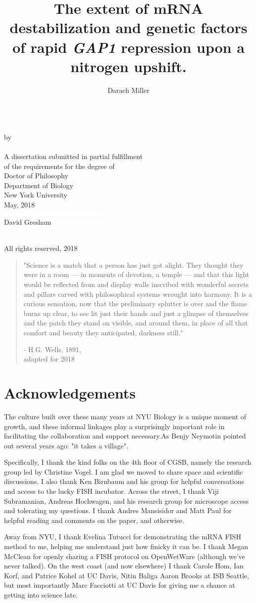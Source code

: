 \documentclass[12pt,letterpaper]{memoir}
\title{
The extent of mRNA destabilization and 
genetic factors of rapid \textit{GAP1} repression 
upon a nitrogen upshift.
}
\author{Darach Miller}
\makeatletter
\def\makemytitle{
  \newpage
\begin{center}
\vfill
  \@title\\
\vfill
  by\\
\vfill
  \@author\\
\vfill
  A dissertation submitted in partial fulfillment \\
  of the requirements for the degree of \\
  Doctor of Philosophy \\
  Department of Biology \\
  New York University \\
\vfill
  \monthz, \yearz\\
  \end{center}
\vfill
\begin{flushright}
  $\rule{5cm}{0.01mm}$\\
  David Gresham
\end{flushright}
  \pagebreak
\begin{center}
  \textcopyright \hspace{0.2em} \@author \\
  All rights reserved, \yearz \\
\end{center}
  \pagebreak
}
\def\monthz{May}
\def\yearz{2018}
\makeatother
\begin{document}
\DoubleSpacing
\frontmatter
\pagestyle{empty}

\makemytitle

\iftrue
\begin{quote}
\SingleSpace
"Science is a match that a person has just got alight. 
They thought they were in a room --- 
in moments of devotion, a temple --- 
and that this light would be reflected from and display walls 
inscribed with wonderful secrets and pillars carved with 
philosophical systems wrought into harmony. 
\vfill
It is a curious sensation, now that the preliminary splutter is 
over and the flame burns up clear, to see lit just their hands and 
just a glimpse of themselves and the patch they stand on visible, and 
around them, in place of all that comfort and beauty they
anticipated, \vspace{0.5em} darkness still."

\hfill - H.G. Wells, 1891, \\\vspace{1em}\hfill adapted for 2018
\end{quote}
\fi

\newpage

\section*{Acknowledgements}

\label{section:acknow}

\iffalse


The culture built over these many years at NYU Biology is a unique 
moment of growth, and these informal linkages play a surprisingly
important role in facilitating the collaboration and support
necessary.As Benjy Neymotin 
pointed out several years ago: "it takes a village".

Specifically,
I thank the kind folks on the 4th floor of CGSB, namely
the research group led by Christine Vogel. I am glad we moved to share
space and scientific discussions.
I also thank Ken Birnbaum and his group for helpful conversations and
access to the lucky FISH incubator.
Across the street, I thank Viji Subramanian, Andreas Hochwagen, 
and his research group for microscope access and tolerating my
questions.
I thank Andres Mansisidor and Matt Paul for helpful reading and 
comments on the paper, and otherwise.

Away from NYU, I thank
Evelina Tutucci for demonstrating the mRNA FISH method to me,
helping me understand just how finicky it can be.
I thank Megan McClean for openly sharing a FISH protocol on
OpenWetWare (although we've never talked).
On the west coast (and now elsewhere) I thank Carole Hom, Ian Korf, 
and Patrice Kohel at UC Davis, Nitin Baliga Aaron Brooks at ISB
Seattle, but most importantly Marc Facciotti at UC Davis for 
giving me a chance at getting into science late.
\end{document}
